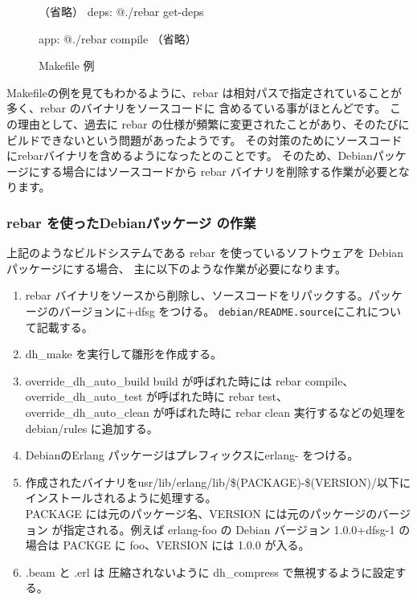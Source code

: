 \documentclass[mingoth,a4paper,twoside]{jsarticle}
\begin{document}
\begin{figure}[h!]
\centering
\begin{commandline}
（省略）
deps:
    @./rebar get-deps

app:
    @./rebar compile
（省略）
\end{commandline}
\caption{Makefile 例}\label{fig:debhelper-makefile}
\vspace{-1.5em}
\end{figure}

Makefileの例を見てもわかるように、rebar は相対パスで指定されていることが多く、rebar のバイナリをソースコードに
含めるている事がほとんどです。
この理由として、過去に rebar の仕様が頻繁に変更されたことがあり、そのたびにビルドできないという問題があったようです。
その対策のためにソースコードにrebarバイナリを含めるようになったとのことです。
そのため、Debianパッケージにする場合にはソースコードから rebar バイナリを削除する作業が必要となります。

\subsubsection{rebar を使ったDebianパッケージ の作業}

上記のようなビルドシステムである rebar を使っているソフトウェアを Debian パッケージにする場合、
主に以下のような作業が必要になります。

\begin{enumerate}
\item %
  rebar バイナリをソースから削除し、ソースコードをリパックする。パッケージのバージョンに+dfsg をつける。
  \texttt{debian/README.source}にこれについて記載する。

\item %
  dh\_make を実行して雛形を作成する。

\item %
  override\_dh\_auto\_build build が呼ばれた時には rebar compile、
  override\_dh\_auto\_test が呼ばれた時に rebar test、
  override\_dh\_auto\_clean が呼ばれた時に rebar clean 実行するなどの処理を debian/rules に追加する。

\item %
  DebianのErlang パッケージはプレフィックスにerlang- をつける。

\item %
  作成されたバイナリをusr/lib/erlang/lib/\$(PACKAGE)-\$(VERSION)/以下にインストールされるように処理する。\\
  PACKAGE には元のパッケージ名、VERSION には元のパッケージのバージョン
  が指定される。例えば erlang-foo の Debian バージョン 1.0.0+dfsg-1 の場合は
  PACKGE に foo、VERSION には 1.0.0 が入る。
\item %
  .beam と .erl は 圧縮されないように dh\_compress で無視するように設定する。
\end{enumerate}
\end{document}
